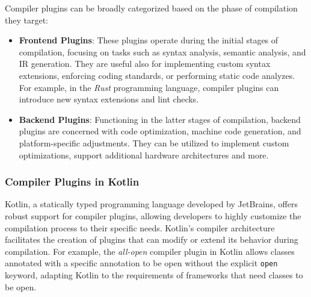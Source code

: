 \documentclass[12pt,a4paper,openright,twoside]{book}
\begin{document}
Compiler plugins can be broadly categorized based on the phase of compilation they target:

\begin{itemize}
  \item \textbf{Frontend Plugins}: These plugins operate during the initial
  stages of compilation, focusing on tasks such as syntax analysis, semantic
  analysis, and \ac{IR} generation. They are useful also for
  implementing custom syntax extensions, enforcing coding standards, or
  performing static code analyzes. For example, in the \emph{Rust} programming
  language, compiler plugins can introduce new syntax extensions and lint
  checks. 

  \item \textbf{Backend Plugins}: Functioning in the latter stages of
  compilation, backend plugins are concerned with code optimization, machine
  code generation, and platform-specific adjustments. They can be utilized to
  implement custom optimizations, support additional hardware
  architectures and more.
\end{itemize}

\subsubsection{Compiler Plugins in Kotlin}

Kotlin, a statically typed programming language developed by JetBrains, offers
robust support for compiler plugins, allowing developers to highly customize the
compilation process to their specific needs. 
%
Kotlin's compiler architecture facilitates the creation of plugins that can
modify or extend its behavior during compilation. For example, the
\emph{all-open} compiler plugin in Kotlin allows classes annotated with a
specific annotation to be open without the explicit \lstinline{open} keyword,
adapting Kotlin to the requirements of frameworks that need classes to be
open. 
\end{document}

